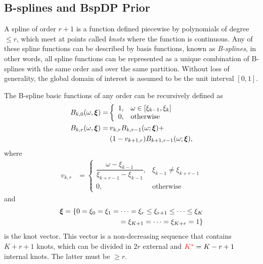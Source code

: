 \documentclass[twocolumn,final]{svjour3}
\newcommand{\bm}[1]{\mbox{\boldmath $#1$}}
\newcommand{\pmr}{ \color{red}}
\begin{document}
\subsection*{B-splines and BspDP Prior}

A spline of {\pmr order} $r+1$ is a function defined piecewise by polynomials of degree $\leq r$, which meet at points called \textit{knots} where the function is continuous.  Any of these spline functions can be described by basis functions, known as \textit{B-splines}, in other words, all spline functions can be represented as a unique combination of B-splines with the same order and over the same partition.  Without loss of generality, the global domain of interest is assumed to be the unit interval $[0,1]$.

The B-spline basic functions of any order can be recursively defined as
\begin{align*}
B_{k,0}(\omega, \bm{\xi})=&	
\left\{
\begin{array}{ll}
1, & \omega \in [\xi_{k-1}, \xi_{k}] \\
0, & \mbox{otherwise} 
\end{array}
\right.\\
B_{k,r}(\omega, \bm{\xi}) = & \:v_{k,r}B_{k,r-1}(\omega; \bm{\xi}) + \\
& \: (1-v_{k+1,r})B_{k+1,r-1}(\omega; \bm{\xi}),	
\end{align*}
where	   
\begin{align*}	   
v_{k,r}&=	
\left\{
\begin{array}{ll}
\dfrac{\omega - \xi_{k-1}}{\xi_{k+r-1} - \xi_{k-1}}, & \xi_{k-1} \neq \xi_{k+r-1}\\
0, & \mbox{otherwise} 
\end{array}
\right.
\end{align*}
and 
\begin{align*}
\bm{\xi} = \{0 = \xi_0 = \xi_1 = \cdots = \xi_r \leq \xi_{r+1} \leq \cdots \leq \xi_{K}\\ = \xi_{K+1} = \cdots = \xi_{K+r} = 1 \}
\end{align*}
is the knot vector.  This vector is a non-decreasing sequence that contains $K+r+1$ knots, which can be divided in $2r$ external and ${\pmr K^*}=K-r+1$ internal knots.  The latter must be $\geq r$.

\end{document}
